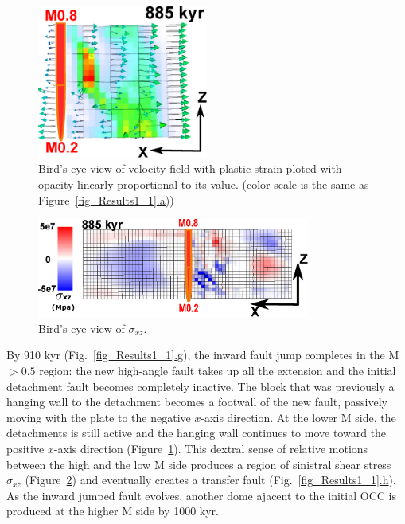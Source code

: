 \begin{figure}[h]
  \centering
    \includegraphics[width=0.5\textwidth]{./Figures/fig_Results_1_velocity_field.eps}
  \caption{Bird's-eye view of velocity field with plastic strain ploted with opacity linearly proportional to its value. (color scale is the same as Figure~\hyperref[fig_Results1_1]{\ref{fig_Results1_1}.a)})}
 \label{fig_Results_1_velocity_field}
\end{figure}

\begin{figure}[h]
   \centering
     \includegraphics[width=0.8\textwidth]{./Figures/fig_Results_1_Sxz.eps}
   \caption{Bird's eye view of $\sigma_{xz}$.}
  \label{fig_Results_1_Sxz}
\end{figure}

By 910 kyr (Fig.~\hyperref[fig_Results1_1]{\ref{fig_Results1_1}.g}), the inward fault jump completes in the M $> 0.5$ region: the new high-angle fault takes up all the extension and the initial detachment fault becomes completely inactive. The block that was previously a hanging wall to the detachment becomes a footwall of the new fault, passively moving with the plate to the negative $x$-axis direction. At the lower M side, the detachments is still active and the hanging wall continues to move toward the positive $x$-axis direction (Figure~\hyperref[fig_Results_1_velocity_field]{\ref{fig_Results_1_velocity_field}}). This dextral sense of relative motions between the high and the low M side produces a region of sinistral shear stress $\sigma_{xz}$ (Figure~\hyperref[fig_Results_1_Sxz]{\ref{fig_Results_1_Sxz}}) and eventually creates a transfer fault (Fig.~\hyperref[fig_Results1_1]{\ref{fig_Results1_1}.h}). %
As the inward jumped fault evolves, another dome ajacent to the initial OCC is produced at the higher M side by 1000 kyr.%


